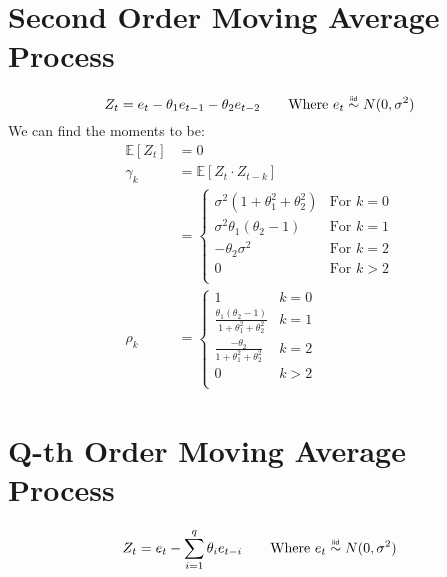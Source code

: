 \section{Second Order Moving Average Process}
\begin{equation*}
    Z_t = e_t - \theta_1 e_{t-1} - \theta_2 e_{t-2} \qquad \text{Where $e_t \iid N(0, \sigma^2)$}
\end{equation*}
We can find the moments to be:
\begin{equation*}
    \begin{aligned}
       \mathbb{E}[Z_t] & = 0 \\
       \gamma_k &= \mathbb{E}[Z_t \cdot Z_{t-k}] \\
           &= \begin{cases}
               \sigma^2 (1 + \theta_1^2 + \theta_2^2) & \text{For $k=0$} \\
                   \sigma^2\theta_1(\theta_2 - 1) & \text{For $k=1$} \\
                   -\theta_2\sigma^2 & \text{For $k=2$} \\
                   0  & \text{For $k>2$} \\
           \end{cases} \\
        \rho_k &= \begin{cases}
            1  \quad &k= 0 \\
            \frac{\theta_1(\theta_2 - 1)}{1 + \theta_1^2 + \theta_2^2} & k=1 \\
            \frac{-\theta_2}{1 + \theta_1^2 + \theta^2_2} & k=2 \\
            0 & k>2 \\
            \end{cases}
    \end{aligned}
\end{equation*}

\section{Q-th Order Moving Average Process}
\begin{equation*}
    Z_t = e_t - \sum_{i=1}^{q} \theta_i e_{t-i} \qquad \text{Where $e_t \iid
    N(0, \sigma^2)$}
\end{equation*}

